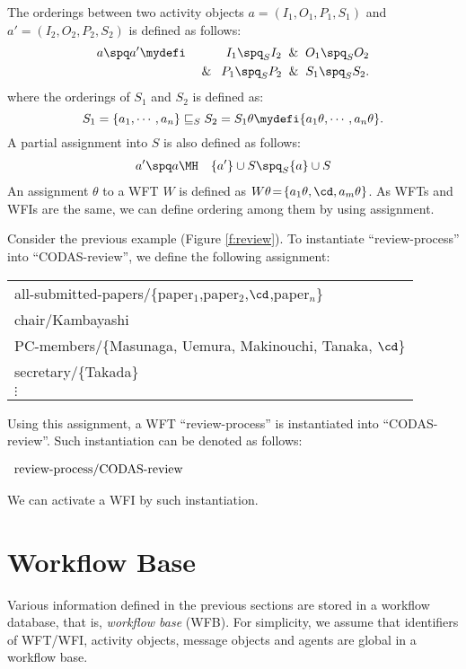 The orderings between two activity objects $a = (I_1, O_1, P_1, S_1)$
and $a' = (I_2, O_2, P_2, S_2)$ is defined as follows:
\begin{eqnarray*}
a \spq a'  &\mydefi&I_1\spq_S I_2\And O_1\spq_S O_2\\
	   &      &\And\: P_1\spq_S P_2\And S_1\spq_S S_2.
\end{eqnarray*}
where the orderings of $S_1$ and $S_2$ is defined as:
\[
 S_1 = \{a_1, \cdots, a_n\} \sqsubseteq_S S_2 = S_1\theta \mydefi
\{a_1\theta, \cdots, a_n\theta\}.
\]
A partial assignment into $S$ is also defined as follows:
\begin{eqnarray*}
a'\spq a&\MH&\{a'\}\cup S\spq_S\{a\}\cup S
\end{eqnarray*}
An assignment $\theta$ to a WFT $W$ is defined as
$W\theta\!=\!\{a_1\theta,\cd,a_m\theta\}$.
As WFTs and WFIs are the same, we can define ordering among them by using 
assignment.

\begin{sloppypar}
 Consider the previous example (Figure \ref{f:review}).
 To instantiate ``review-process'' into ``CODAS-review'',
 we define the following assignment:
 \begin{center}
 \begin{tabular}{l}
  all-submitted-papers/\{paper$_1$,paper$_2$,$\cd$,paper$_n$\}\\
  chair/Kambayashi\\
  PC-members/\{Masunaga, Uemura, Makinouchi, Tanaka, $\cd$\}\\
  secretary/\{Takada\}\\
  $\vdots$
 \end{tabular}
 \end{center}
 Using this assignment, a WFT ``review-process'' is instantiated into
 ``CODAS-review''.  Such instantiation can be denoted as follows:
 \begin{center}
 $\begin{array}[t]{l}
	\mbox{review-process}/\mbox{CODAS-review}
 \end{array}$
 \end{center}
 We can activate a WFI by such instantiation.
\end{sloppypar}

\section{Workflow Base}
\label{sec:workflowbase}

Various information defined in the previous sections are stored in a
workflow database, that is, {\em workflow base} (WFB)\@.
For simplicity, we assume that identifiers of WFT/WFI, activity objects,
message objects and agents are global in a workflow base.

